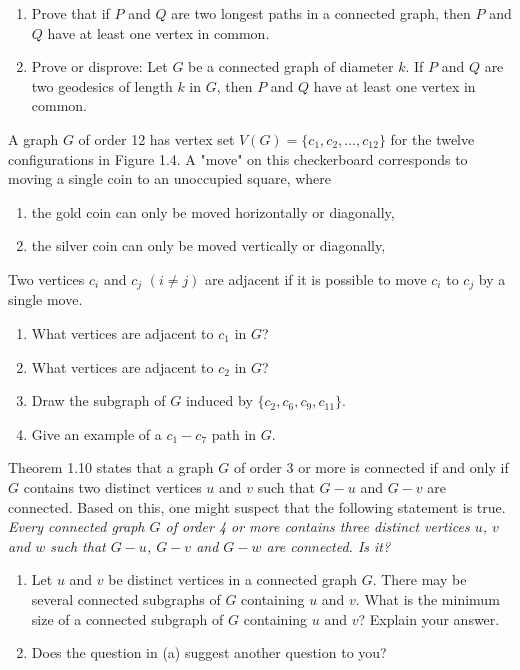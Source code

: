 \begin{exer}
\begin{enumerate}[{(a)}]
\item Prove that if $P$ and $Q$ are two longest paths in a connected graph, then $P$ and $Q$ have at least one vertex in common.
\item Prove or disprove: Let $G$ be a connected graph of diameter $k$. If $P$ and $Q$ are two geodesics of length $k$ in $G$, then $P$ and $Q$ have at least one vertex in common.
\end{enumerate}
\end{exer}

\begin{exer}
A graph $G$ of order 12 has vertex set $V(G) = \{c_{1},c_{2},\ldots,c_{12}\}$ for the twelve configurations in Figure 1.4. A "move" on this checkerboard corresponds to moving a single coin to an unoccupied square, where
\begin{enumerate}[{(1)}]
\item the gold coin can only be moved horizontally or diagonally,
\item the silver coin can only be moved vertically or diagonally,
\end{enumerate}
Two vertices $c_{i}$ and $c_{j}$ $(i \neq j)$ are adjacent if it is possible to move $c_{i}$ to $c_{j}$ by a single move.
\begin{enumerate}[{(a)}]
\item What vertices are adjacent to $c_{1}$ in $G$?
\item What vertices are adjacent to $c_{2}$ in $G$?
\item Draw the subgraph of $G$ induced by $\{c_{2},c_{6},c_{9},c_{11}\}$.
\item Give an example of a $c_{1}-c_{7}$ path in $G$.
\end{enumerate}
\end{exer}

\begin{exer}
Theorem 1.10 states that a graph $G$ of order 3 or more is connected if and only if $G$ contains two distinct vertices $u$ and $v$ such that $G-u$ and $G-v$ are connected. Based on this, one might suspect that the following statement is true. \it{Every connected graph $G$ of order 4 or more contains three distinct vertices $u$, $v$ and $w$ such that $G-u$, $G-v$ and $G-w$ are connected.} Is it?
\end{exer}

\begin{exer}
\begin{enumerate}[{(a)}]
\item Let $u$ and $v$ be distinct vertices in a connected graph $G$. There may be several connected subgraphs of $G$ containing $u$ and $v$. What is the minimum size of a connected subgraph of $G$ containing $u$ and $v$? Explain your answer.
\item Does the question in (a) suggest another question to you?
\end{enumerate}
\end{exer}